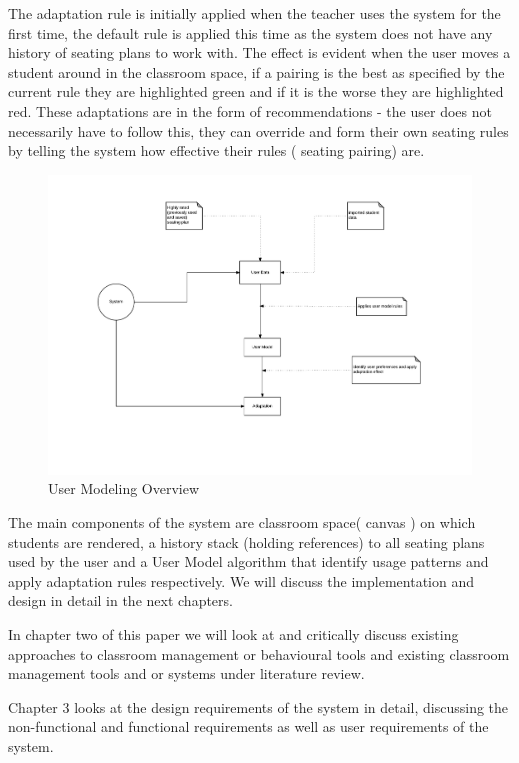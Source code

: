 The adaptation rule is initially applied when the teacher uses the system for the first time, the default rule is applied this time as the system does not have any history of seating plans to work with. The effect is evident when the user moves a student around in the classroom space, if a pairing is the best as specified by the current rule they are highlighted green and if it is the worse they are highlighted red. These adaptations are in the form of recommendations - the user does not necessarily have to follow this, they can override and form their own seating rules by telling the system how effective their rules ( seating pairing) are.


\begin{figure}[!ht]
\caption{User Modeling Overview}
    \label{fig:User-Model}
    \centering
    \includegraphics[scale=0.5]{figures/UM_Overview}
\end{figure}

The main components of the system are classroom space( canvas ) on which students are rendered, a history stack (holding references) to all seating plans used by the user and a User Model algorithm that identify usage patterns and apply adaptation rules respectively. We will discuss the implementation and design in detail in the next chapters.

In chapter two of this paper we will look at and critically discuss existing approaches to classroom management or behavioural tools and existing classroom management tools and or systems under literature review.

Chapter 3 looks at the design requirements of the system in detail, discussing the non-functional and functional requirements as well as user requirements of the system.

